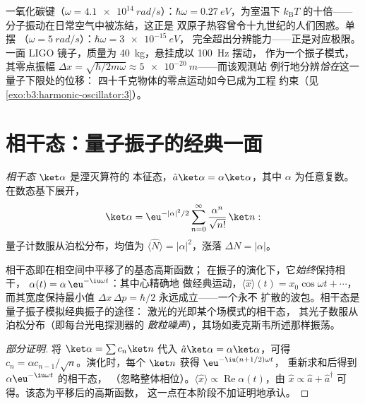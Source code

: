 \begin{example}\label{ex:b3:harmonic-oscillator:scales}
一氧化碳键（$\omega = \qty{4.1e14}{rad/s}$）：$\hbar\omega =
\qty{0.27}{eV}$，为室温下 $k_{\text{B}}T$ 的十倍——
分子振动在日常空气中被冻结，这正是
双原子热容曾令十九世纪的人们困惑。单摆
（$\omega = \qty{5}{rad/s}$）：$\hbar\omega = \qty{3e-15}{eV}$，
完全超出分辨能力——正是对应极限。一面 LIGO
镜子，质量为 \qty{40}{kg}，悬挂成以 \qty{100}{Hz} 摆动，
作为一个振子模式，其零点振幅 $\Delta x =
\sqrt{\hbar/2m\omega} \approx \qty{5e-20}{m}$——而该观测站
例行地分辨\emph{恰在}这一量子下限处的位移：
四十千克物体的零点运动如今已成为工程
约束（见\cref{exo:b3:harmonic-oscillator:3}）。
\end{example}

\section{相干态：量子振子的经典一面}

\begin{definition}[相干态]\label{def:b3:harmonic-oscillator:coherent}
\emph{相干态} $\ket\alpha$ 是湮灭算符的
本征态，$\hat a\ket\alpha = \alpha\ket\alpha$，其中
$\alpha$ 为任意复数。在数态基下展开，
\[
\ket\alpha = \eu^{-|\alpha|^2/2}\sum_{n=0}^\infty
\frac{\alpha^n}{\sqrt{n!}}\,\ket n :
\]
量子计数服从泊松分布，均值为 $\langle\hat
N\rangle = |\alpha|^2$，涨落 $\Delta N = |\alpha|$。
\end{definition}

\begin{proposition}[为什么激光是经典的]\label{prop:b3:harmonic-oscillator:coherent-motion}
相干态即在相空间中平移了的基态高斯函数；
在振子的演化下，它\emph{始终}保持相干，
$\alpha(t) = \alpha\,\eu^{-\iu\omega t}$：其中心精确地
做经典运动，$\langle\hat x\rangle(t) =
x_0\cos\omega t + \cdots$，而其宽度保持最小值
$\Delta x\,\Delta p = \hbar/2$ 永远成立——一个永不
扩散的波包。相干态是量子振子模拟经典振子的途径：
激光的光即某个场模式的相干态，
其光子数服从泊松分布（即每台光电探测器的
\emph{散粒噪声}），其场如麦克斯韦所述那样振荡。
\end{proposition}

\begin{proof}[部分证明]
将 $\ket\alpha = \sum c_n\ket n$ 代入
$\hat a\ket\alpha = \alpha\ket\alpha$，可得 $c_n = \alpha c_{n-1}/\sqrt
n$。演化时，每个 $\ket n$ 获得 $\eu^{-\iu(n + 1/2)\omega t}$，
重新求和后得到 $\alpha\eu^{-\iu\omega t}$ 的相干态，
（忽略整体相位）。$\langle\hat x\rangle \propto
\operatorname{Re}\alpha(t)$，由 $\hat x \propto \hat a +
\hat a^\dagger$ 可得。该态为平移后的高斯函数，
这一点在本阶段不加证明地承认。
\end{proof}

